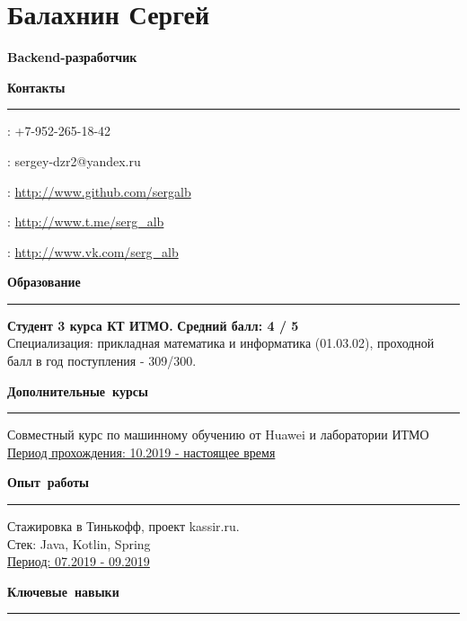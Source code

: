 \documentclass[12pt, a4paper]{report}
\author{Балахнин Сергей}
\begin{document}
    \section*{Балахнин Сергей}

    {\large\textbf{Backend-разработчик}}

    \hbox{\large\textbf{Контакты}}\kern5pt\hrule\kern5pt

    \faPhone: +7-952-265-18-42

    \Letter: sergey-dzr2@yandex.ru

    \faGithub: \url{http://www.github.com/sergalb}

    \faSend: \url{http://www.t.me/serg_alb}

    \faVk: \url{http://www.vk.com/serg_alb} \\



    \par\hbox{\large\textbf{Образование}}\kern5pt\hrule\kern5pt

    \textbf{Студент 3 курса КТ ИТМО.}
    \hfill
    \textbf{ Средний балл: 4 / 5} \\
    Специализация: прикладная математика и информатика (01.03.02), проходной балл в год поступления - 309/300.\\

    \par\hbox{\large\textbf{Дополнительные курсы}}\kern5pt\hrule\kern5pt
    Совместный курс по машинному обучению от Huawei и лаборатории ИТМО \\
    \underline{Период прохождения: 10.2019 - настоящее время} \\


    \par\hbox{\large\textbf{Опыт работы}}\kern3pt\hrule\kern10pt

    Стажировка в Тинькофф, проект kassir.ru. \\
    Стек: Java, Kotlin, Spring \\
    \underline{Период: 07.2019 - 09.2019} \\


    \par\hbox{\large\textbf{Ключевые навыки}}\kern5pt\hrule\kern5pt
\end{document}
